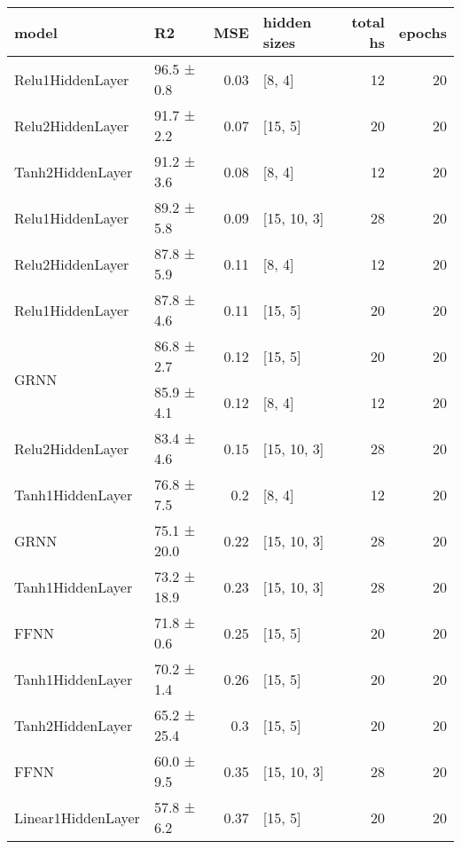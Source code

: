 
    \begin{table*}
        \centering
        \begin{tabular}{llrlrr}
\hline
 model                        & R2          &   MSE & hidden sizes   &   total hs &   epochs \\
\hline
 Relu1HiddenLayer             & 96.5 ± 0.8  &  0.03 & [8, 4]         &         12 &       20 \\
 Relu2HiddenLayer             & 91.7 ± 2.2  &  0.07 & [15, 5]        &         20 &       20 \\
 Tanh2HiddenLayer             & 91.2 ± 3.6  &  0.08 & [8, 4]         &         12 &       20 \\
 Relu1HiddenLayer             & 89.2 ± 5.8  &  0.09 & [15, 10, 3]    &         28 &       20 \\
 Relu2HiddenLayer             & 87.8 ± 5.9  &  0.11 & [8, 4]         &         12 &       20 \\
 Relu1HiddenLayer             & 87.8 ± 4.6  &  0.11 & [15, 5]        &         20 &       20 \\
 \hline
\multirow{2}{*}{GRNN} & 86.8 ± 2.7  &  0.12 & [15, 5]        &         20 &       20 \\
                              & 85.9 ± 4.1  &  0.12 & [8, 4]         &         12 &       20 \\
 Relu2HiddenLayer             & 83.4 ± 4.6  &  0.15 & [15, 10, 3]    &         28 &       20 \\
 Tanh1HiddenLayer             & 76.8 ± 7.5  &  0.2  & [8, 4]         &         12 &       20 \\
 GRNN                         & 75.1 ± 20.0 &  0.22 & [15, 10, 3]    &         28 &       20 \\
 Tanh1HiddenLayer             & 73.2 ± 18.9 &  0.23 & [15, 10, 3]    &         28 &       20 \\
 FFNN                         & 71.8 ± 0.6  &  0.25 & [15, 5]        &         20 &       20 \\
 Tanh1HiddenLayer             & 70.2 ± 1.4  &  0.26 & [15, 5]        &         20 &       20 \\
 Tanh2HiddenLayer             & 65.2 ± 25.4 &  0.3  & [15, 5]        &         20 &       20 \\
 FFNN                         & 60.0 ± 9.5  &  0.35 & [15, 10, 3]    &         28 &       20 \\
 Linear1HiddenLayer           & 57.8 ± 6.2  &  0.37 & [15, 5]        &         20 &       20 \\

\end{tabular}
\end{table*}
